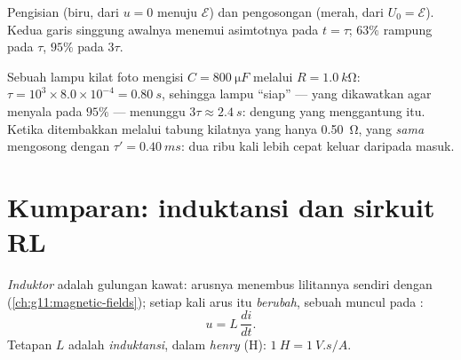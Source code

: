\begin{omfigure}

{\small Pengisian (biru, dari $u = 0$ menuju $\mathcal{E}$) dan pengosongan
(merah, dari $U_0 = \mathcal{E}$). Kedua garis singgung awalnya menemui
asimtotnya pada $t = \tau$; $63\%$ rampung pada $\tau$, $95\%$ pada $3\tau$.}
\end{omfigure}

\begin{example}\label{ex:g12:rc-rl-circuits:flashrc}
Sebuah lampu kilat foto mengisi $C = \qty{800}{\micro F}$ melalui
$R = \qty{1.0}{k\ohm}$: $\tau = 10^3 \times 8.0\times10^{-4} =
\qty{0.80}{s}$, sehingga lampu ``siap'' --- yang dikawatkan agar menyala pada $95\%$ ---
menunggu $3\tau \approx \qty{2.4}{s}$: dengung yang menggantung itu. Ketika ditembakkan
melalui tabung kilatnya yang hanya \qty{0.50}{\ohm},  yang \emph{sama}
mengosong dengan $\tau' = \qty{0.40}{ms}$: dua ribu kali
lebih cepat keluar daripada masuk.
\end{example}

\section{Kumparan: induktansi dan sirkuit RL}

\begin{definition}\label{def:g12:rc-rl-circuits:inductor}
\emph{Induktor} adalah gulungan kawat: arusnya
menembus lilitannya sendiri dengan 
(\cref{ch:g11:magnetic-fields}); setiap kali arus itu \emph{berubah}, sebuah 
muncul pada :
\[
u = L\,\frac{di}{dt} .
\]
Tetapan $L$ adalah \emph{induktansi}, dalam
\emph{henry} (\unit{H}): $\qty{1}{H} = \qty{1}{V.s/A}$.
\end{definition}
\admitted

